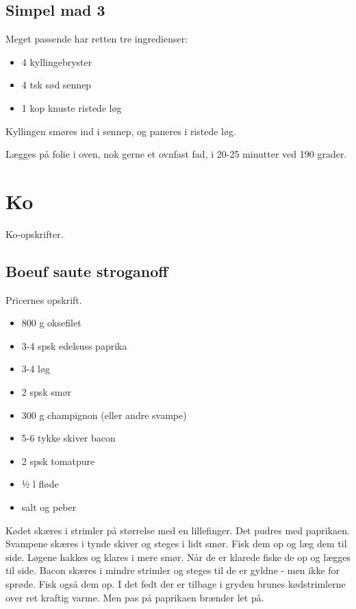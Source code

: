\documentclass[
]{book}
\providecommand{\tightlist}{%
  \setlength{\itemsep}{0pt}\setlength{\parskip}{0pt}}
\begin{document}
\hypertarget{simpel-mad-3}{%
\section{Simpel mad 3}\label{simpel-mad-3}}

Meget passende har retten tre ingredienser:

\begin{itemize}
\tightlist
\item
  4 kyllingebryster
\item
  4 tsk sød sennep
\item
  1 kop knuste ristede løg
\end{itemize}

Kyllingen smøres ind i sennep, og paneres i ristede løg.~

Lægges på folie i oven, nok gerne et ovnfast fad, i 20-25 minutter ved 190 grader.

\hypertarget{ko}{%
\chapter{Ko}\label{ko}}

Ko-opskrifter.

\hypertarget{boeuf-saute-stroganoff}{%
\section{Boeuf saute stroganoff}\label{boeuf-saute-stroganoff}}

Pricernes opskrift.

\begin{itemize}
\tightlist
\item
  800 g oksefilet
\item
  3-4 spsk edelsuss paprika
\item
  3-4 løg
\item
  2 spsk smør
\item
  300 g champignon (eller andre svampe)
\item
  5-6 tykke skiver bacon
\item
  2 spsk tomatpure
\item
  ½ l fløde
\item
  salt og peber
\end{itemize}

Kødet skæres i strimler på størrelse med en lillefinger. Det pudres med
paprikaen.
Svampene skæres i tynde skiver og steges i lidt smør. Fisk dem op og læg
dem til side.
Løgene hakkes og klares i mere smør. Når de er klarede fiske de op og lægges
til side.
Bacon skæres i mindre strimler og steges til de er gyldne - men ikke for
sprøde. Fisk også dem op.
I det fedt der er tilbage i gryden brunes kødstrimlerne over ret kraftig varme. Men pas på paprikaen brænder let på.
\end{document}
